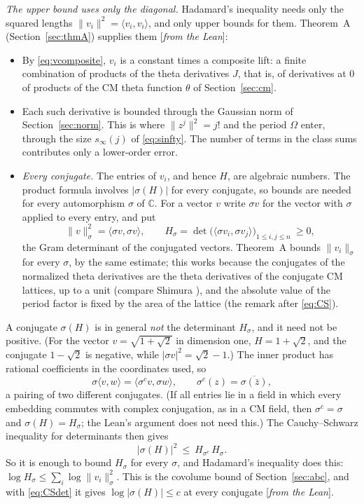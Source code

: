 \documentclass[11pt]{amsart}
\numberwithin{equation}{section}
\theoremstyle{definition}
\theoremstyle{remark}
\newcommand{\C}{\mathbb C}
\newcommand{\status}[1]{\textup{[\emph{#1}]}}
\begin{document}
\emph{The upper bound uses only the diagonal.} Hadamard's inequality needs only the squared lengths $\|v_i\|^2=\langle v_i,v_i\rangle$, and only upper bounds for them. Theorem~A (Section~\ref{sec:thmA}) supplies them \status{from the Lean}:
\begin{itemize}[leftmargin=2em]
\item By \eqref{eq:vcomposite}, $v_i$ is a constant times a composite lift: a finite combination of products of the theta derivatives $J$, that is, of derivatives at $0$ of products of the CM theta function $\theta$ of Section~\ref{sec:cm}.
\item Each such derivative is bounded through the Gaussian norm of Section~\ref{sec:norm}. This is where $\|z^j\|^2=j!$ and the period $\Omega$ enter, through the size $s_\infty(j)$ of \eqref{eq:sinfty}. The number of terms in the class sums contributes only a lower-order error.
\item \emph{Every conjugate.} The entries of $v_i$, and hence $H$, are algebraic numbers. The product formula involves $|\sigma(H)|$ for every conjugate, so bounds are needed for every automorphism $\sigma$ of $\C$. For a vector $v$ write $\sigma v$ for the vector with $\sigma$ applied to every entry, and put
\begin{equation}\label{eq:Hsigma}
 \|v\|_\sigma^2=\langle\sigma v,\sigma v\rangle,\qquad H_\sigma=\det\bigl(\langle\sigma v_i,\sigma v_j\rangle\bigr)_{1\le i,j\le n}\ \ge0,
\end{equation}
the Gram determinant of the conjugated vectors. Theorem~A bounds $\|v_i\|_\sigma$ for every $\sigma$, by the same estimate; this works because the conjugates of the normalized theta derivatives are the theta derivatives of the conjugate CM lattices, up to a unit (compare Shimura \cite{shimuraCM}), and the absolute value of the period factor is fixed by the area of the lattice (the remark after \eqref{eq:CS}).
\end{itemize}
A conjugate $\sigma(H)$ is in general \emph{not} the determinant $H_\sigma$, and it need not be positive. (For the vector $v=\sqrt{1+\sqrt2}$ in dimension one, $H=1+\sqrt2$, and the conjugate $1-\sqrt2$ is negative, while $|\sigma v|^2=\sqrt2-1$.) The inner product has rational coefficients in the coordinates used, so
\begin{equation}\label{eq:mixed}
 \sigma\langle v,w\rangle=\langle\sigma^cv,\sigma w\rangle,\qquad\sigma^c(z)=\overline{\sigma(\bar z)},
\end{equation}
a pairing of two different conjugates. (If all entries lie in a field in which every embedding commutes with complex conjugation, as in a CM field, then $\sigma^c=\sigma$ and $\sigma(H)=H_\sigma$; the Lean's argument does not need this.) The Cauchy--Schwarz inequality for determinants then gives
\begin{equation}\label{eq:CSdet}
 |\sigma(H)|^2\ \le\ H_{\sigma^c}\,H_\sigma .
\end{equation}
So it is enough to bound $H_\sigma$ for every $\sigma$, and Hadamard's inequality does this: $\log H_\sigma\le\sum_i\log\|v_i\|_\sigma^2$. This is the covolume bound of Section~\ref{sec:abc}, and with \eqref{eq:CSdet} it gives $\log|\sigma(H)|\le c$ at every conjugate \status{from the Lean}.
\end{document}
